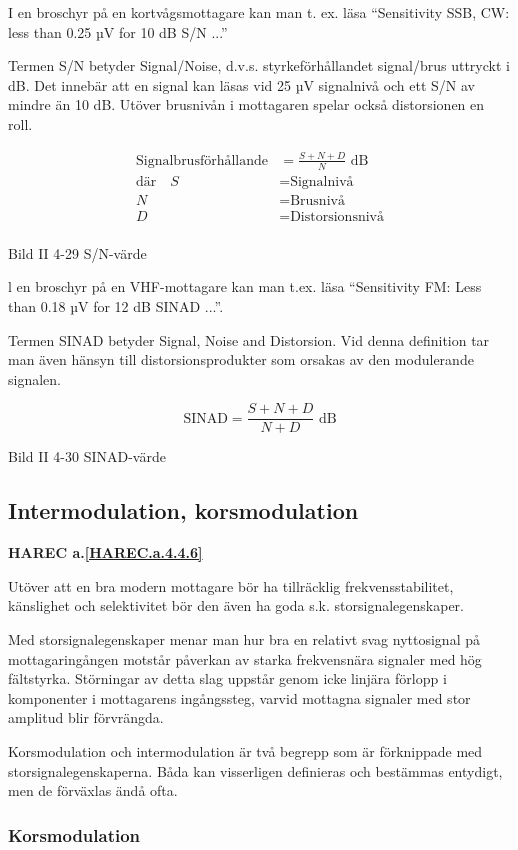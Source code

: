 I en broschyr på en kortvågsmottagare kan man t. ex. läsa
``Sensitivity SSB, CW: less than 0.25 µV for 10 dB S/N ...''

Termen S/N betyder Signal/Noise, d.v.s.  styrkeförhållandet
signal/brus uttryckt i dB.  Det innebär att en signal kan läsas vid 25
µV signalnivå och ett S/N av mindre än 10 dB.  Utöver brusnivån i
mottagaren spelar också distorsionen en roll.

\begin{align*}
  \text{Signalbrusförhållande} &= \frac{S + N + D}{N} \text{ dB} \\
  \text{där} \quad S &= \text{Signalnivå} \\
  N &= \text{Brusnivå} \\
  D &= \text{Distorsionsnivå} \\
\end{align*}

Bild II 4-29 S/N-värde

l en broschyr på en VHF-mottagare kan man t.ex. läsa
``Sensitivity FM: Less than 0.18 µV for 12 dB SINAD ...''.

Termen SINAD betyder Signal, Noise and Distorsion. Vid denna
definition tar man även hänsyn till distorsionsprodukter som orsakas
av den modulerande signalen. 

\[
\text{SINAD} = \frac{S+N+D}{N+D}\text{ dB}
\]

Bild II 4-30 SINAD-värde

\subsection{Intermodulation, korsmodulation}
\textbf{HAREC a.\ref{HAREC.a.4.4.6}\label{myHAREC.a.4.4.6}}

Utöver att en bra modern mottagare bör ha tillräcklig
frekvensstabilitet, känslighet och selektivitet bör den även ha goda
s.k. storsignalegenskaper.

Med storsignalegenskaper menar man hur bra en relativt svag
nyttosignal på mottagaringången motstår påverkan av starka
frekvensnära signaler med hög fältstyrka.  Störningar av detta slag
uppstår genom icke linjära förlopp i komponenter i mottagarens
ingångssteg, varvid mottagna signaler med stor amplitud blir
förvrängda.

Korsmodulation och intermodulation är två begrepp som är förknippade
med storsignalegenskaperna. Båda kan visserligen definieras och
bestämmas entydigt, men de förväxlas ändå ofta.

\subsubsection{Korsmodulation}

